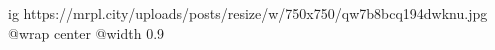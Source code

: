  
 
 
 
 

\ifcmt
  ig https://mrpl.city/uploads/posts/resize/w/750x750/qw7b8bcq194dwknu.jpg
  @wrap center
  @width 0.9
\fi
